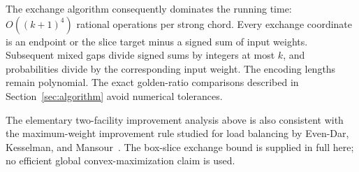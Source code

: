 \documentclass[11pt,a4paper]{article}
\begin{document}
The exchange algorithm consequently dominates the running time:
$O((k+1)^4)$ rational operations per strong chord. Every exchange coordinate
is an endpoint or the slice target minus a signed sum of input weights.
Subsequent mixed gaps divide signed sums by integers at most $k$, and
probabilities divide by the corresponding input weight. The encoding
lengths remain polynomial. The exact golden-ratio comparisons described
in Section~\ref{sec:algorithm} avoid numerical tolerances.

The elementary two-facility improvement analysis above is also consistent
with the maximum-weight improvement rule studied for load balancing by
Even-Dar, Kesselman, and Mansour~\cite{evendar2007}. The box-slice exchange
bound is supplied in full here; no efficient global convex-maximization
claim is used.
\end{document}
